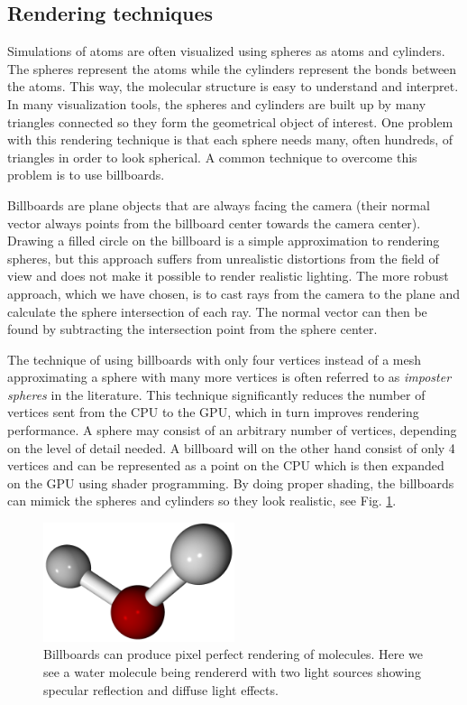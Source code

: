 \documentclass[aps,pre,twocolumn,letterpaper,floatfix,nofootinbib]{revtex4}
\begin{document}
\subsection{Rendering techniques}

Simulations of atoms are often visualized using spheres as atoms and cylinders.
The spheres represent the atoms while the cylinders represent the bonds between
the atoms.
This way, the molecular structure is easy to understand and interpret.
In many visualization tools, the spheres and cylinders are built up by many
triangles connected so they form the geometrical object of interest.
One problem with this rendering technique is that each sphere needs many,
often hundreds, of triangles in order to look spherical.
A common technique to overcome this problem is to use billboards.

Billboards are plane objects that are always facing the camera (their normal
vector always points from the billboard center towards the camera center).
Drawing a filled circle on the billboard is a simple approximation to rendering
spheres, but this approach suffers from unrealistic distortions from the field
of view and does not make it possible to render realistic lighting.
The more robust approach, which we have chosen,
is to cast rays from the camera to the plane and calculate the sphere
intersection of each ray.
The normal vector can then be found by subtracting the intersection point from
the sphere center.

The technique of using billboards with only four vertices instead of a mesh
approximating a sphere with many more vertices is often referred to as
\emph{imposter spheres} in the literature.
This technique significantly reduces the number of vertices sent from the CPU to
the GPU, which in turn improves rendering performance.
A sphere may consist of an arbitrary number of vertices,
depending on the level of detail needed.
A billboard will on the other hand consist of only 4 vertices and can be
represented as a point on the CPU which is then expanded on the GPU using shader
programming.
By doing proper shading, the billboards can mimick the spheres and cylinders so
they look realistic, see Fig. \ref{fig:final_billboards}.

\begin{figure}
	\centering
	\includegraphics[width=0.5\textwidth]{final_billboard.png}
	\caption{Billboards can produce pixel perfect rendering of molecules. Here we see a water molecule being rendererd with two light sources showing specular reflection and diffuse light effects.}
	\label{fig:final_billboards}
\end{figure}
\end{document}
